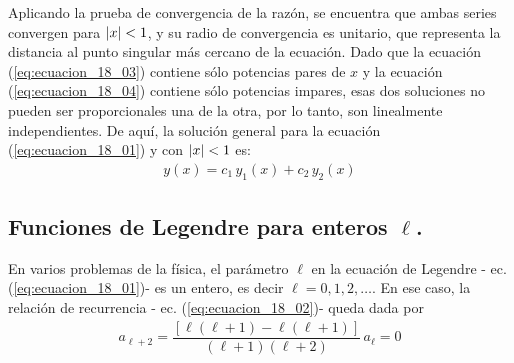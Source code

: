 Aplicando la prueba de convergencia de la razón, se encuentra que ambas series convergen para $\abs{x} < 1$, y su radio de convergencia es unitario, que representa la distancia al punto singular más cercano de la ecuación. Dado que la ecuación (\ref{eq:ecuacion_18_03}) contiene sólo potencias pares de $x$ y la ecuación (\ref{eq:ecuacion_18_04}) contiene sólo potencias impares, esas dos soluciones no pueden ser proporcionales una de la otra, por lo tanto, son linealmente independientes. De aquí, la solución general para la ecuación (\ref{eq:ecuacion_18_01}) y con $\abs{x} < 1$ es:
\begin{align*}
y(x) = c_{1} \, y_{1}(x) + c_{2} \, y_{2}(x)
\end{align*}

\subsection{Funciones de Legendre para enteros \texorpdfstring{$\ell$}{l}.}

En varios problemas de la física, el parámetro $\ell$ en la ecuación de Legendre - ec. (\ref{eq:ecuacion_18_01})- es un entero, es decir $\ell = 0,1,2,\ldots$. En ese caso, la relación de recurrencia - ec. (\ref{eq:ecuacion_18_02})- queda dada por
\begin{align*}
a_{\ell + 2} = \dfrac{[ \ell (\ell + 1) - \ell (\ell + 1) ]}{(\ell + 1)(\ell + 2)} \, a_{\ell} = 0
\end{align*}


